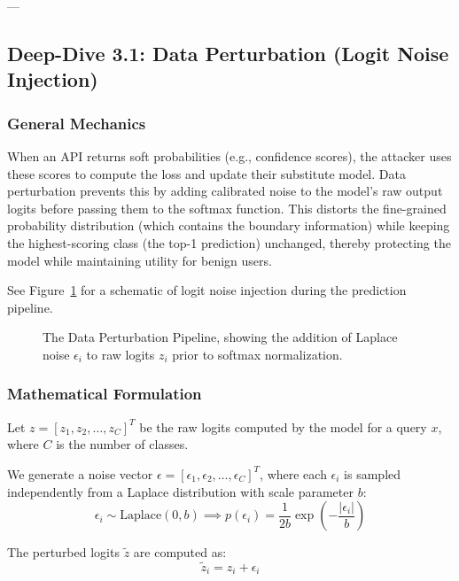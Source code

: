 \documentclass{article}
\begin{document}
---

\subsection{Deep-Dive 3.1: Data Perturbation (Logit Noise Injection)}

\subsubsection{General Mechanics}
When an API returns soft probabilities (e.g., confidence scores), the attacker uses these scores to compute the loss and update their substitute model. Data perturbation prevents this by adding calibrated noise to the model's raw output logits before passing them to the softmax function. This distorts the fine-grained probability distribution (which contains the boundary information) while keeping the highest-scoring class (the top-1 prediction) unchanged, thereby protecting the model while maintaining utility for benign users.

See Figure~\ref{fig:data_perturbation} for a schematic of logit noise injection during the prediction pipeline.

\begin{figure}[htbp]
    \centering
    \caption{The Data Perturbation Pipeline, showing the addition of Laplace noise $\epsilon_i$ to raw logits $z_i$ prior to softmax normalization.}
    \label{fig:data_perturbation}
\end{figure}

\subsubsection{Mathematical Formulation}
Let $z = [z_1, z_2, \dots, z_C]^T$ be the raw logits computed by the model for a query $x$, where $C$ is the number of classes. 

We generate a noise vector $\epsilon = [\epsilon_1, \epsilon_2, \dots, \epsilon_C]^T$, where each $\epsilon_i$ is sampled independently from a Laplace distribution with scale parameter $b$:
\begin{equation}
    \epsilon_i \sim \text{Laplace}(0, b) \implies p(\epsilon_i) = \frac{1}{2b} \exp\left( -\frac{|\epsilon_i|}{b} \right)
\end{equation}

The perturbed logits $\tilde{z}$ are computed as:
\begin{equation}
    \tilde{z}_i = z_i + \epsilon_i
\end{equation}
\end{document}
